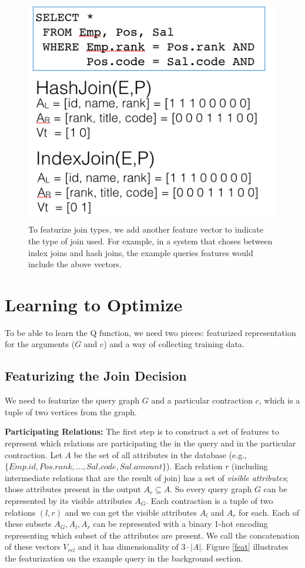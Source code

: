 \begin{figure}
    \centering
    \includegraphics[width=0.8\columnwidth]{figs/type.png}
    \caption{To featurize join types, we add another feature vector to indicate the type of join used. For example, in a system that choses between index joins and hash joins, the example queries features would include the above vectors. \label{feat:type}}
\end{figure}

\section{Learning to Optimize}
To be able to learn the Q function, we need two pieces: featurized representation for the arguments ($G$ and $c$) and a way of collecting training data.

\subsection{Featurizing the Join Decision}
We need to featurize the query graph $G$ and a particular contraction $c$, which is a tuple of two vertices from the graph. 

\vspace{0.5em} \noindent \textbf{Participating Relations: } The first step is to construct a set of features to represent which relations are participating the in the query and in the particular contraction. Let $A$ be the set of all attributes in the database (e.g., $ \{Emp.id, Pos.rank,...,Sal.code,Sal.amount\}$). Each relation $r$ (including intermediate relations that are the result of join) has a set of \emph{visible attributes}; those attributes present in the output $A_r \subseteq A$. So every query graph $G$ can be represented by its visible attributes $A_G$. Each contraction is a tuple of two relations $(l,r)$ and we can get the visible attributes $A_l$ and $A_r$ for each. Each of these subsets $A_G, A_l, A_r$ can be represented with a binary 1-hot encoding representing which subset of the attributes are present. We call the concatenation of these vectors $V_{rel}$ and it has dimensionality of $3\cdot|A|$. Figure \ref{feat} illustrates the featurization on the example query in the background section. 

